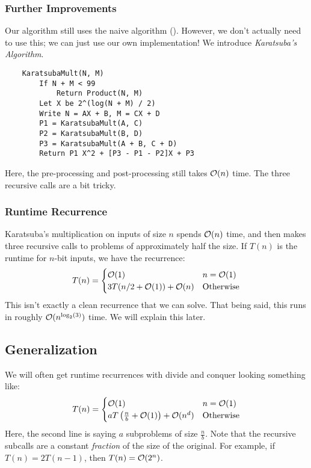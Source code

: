 \documentclass[letterpaper]{article}
\begin{document}
\subsubsection{Further Improvements}
Our algorithm still uses the naive algorithm (). However, we don't actually need to use this; we can just use our own implementation! We introduce \emph{Karatsuba's Algorithm}.

\begin{verbatim}
    KaratsubaMult(N, M)
        If N + M < 99
            Return Product(N, M)
        Let X be 2^(log(N + M) / 2)
        Write N = AX + B, M = CX + D 
        P1 = KaratsubaMult(A, C)
        P2 = KaratsubaMult(B, D)
        P3 = KaratsubaMult(A + B, C + D)
        Return P1 X^2 + [P3 - P1 - P2]X + P3
\end{verbatim}
Here, the pre-processing and post-processing still takes $\mathcal{O}(n)$ time. The three recursive calls are a bit tricky. 

\subsubsection{Runtime Recurrence}
Karatsuba's multiplication on inputs of size $n$ spends $\mathcal{O}(n)$ time, and then makes three recursive calls to problems of approximately half the size. If $T(n)$ is the runtime for $n$-bit inputs, we have the recurrence:
\[T(n) = \begin{cases}
    \mathcal{O}(1) & n = \mathcal{O}(1) \\ 
    3T(n / 2 + \mathcal{O}(1)) + \mathcal{O}(n) & \text{Otherwise}
\end{cases}\]
This isn't exactly a clean recurrence that we can solve. That being said, this runs in roughly $\mathcal{O}(n^{\log_{2}(3)})$ time. We will explain this later. 

\subsection{Generalization}
We will often get runtime recurrences with divide and conquer looking something like: 
\[T(n) = \begin{cases}
    \mathcal{O}(1) & n = \mathcal{O}(1) \\ 
    aT\left(\frac{n}{b} + \mathcal{O}(1)\right) + \mathcal{O}(n^d) & \text{Otherwise}
\end{cases}\]
Here, the second line is saying $a$ subproblems of size $\frac{n}{b}$. Note that the recursive subcalls are a constant \emph{fraction} of the size of the original. For example, if $T(n) = 2T(n - 1)$, then $T(n) = \mathcal{O}(2^n)$. 
\end{document}
